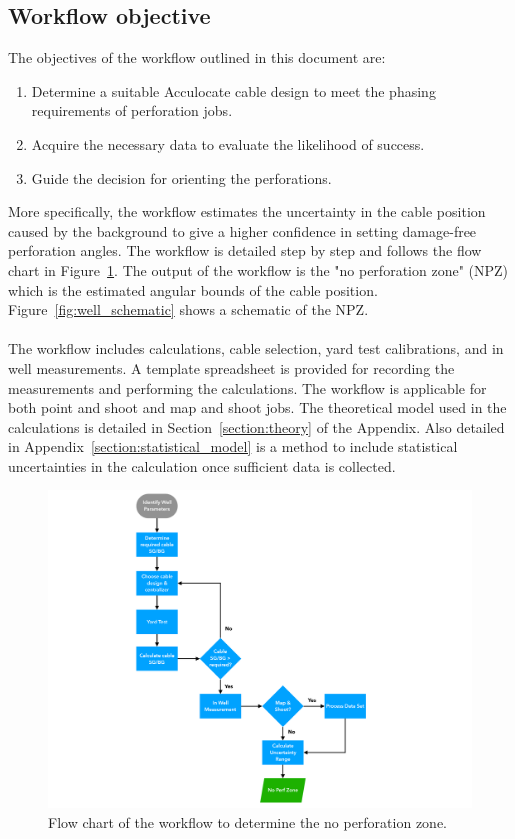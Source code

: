 \documentclass[paper=a4, fontsize=11pt]{scrartcl}
\numberwithin{equation}{section}		%
\numberwithin{figure}{section}			%
\numberwithin{table}{section}				%
\begin{document}
\subsection{Workflow objective}
The objectives of the workflow outlined in this document are:
\begin{enumerate}
    \item Determine a suitable Acculocate cable design to meet the phasing requirements of perforation jobs.
    \item Acquire the necessary data to evaluate the likelihood of success.
    \item Guide the decision for orienting the perforations.
\end{enumerate}
More specifically, the workflow estimates the uncertainty in the cable position caused by the background to give a higher confidence in setting damage-free perforation angles.  The workflow is detailed step by step and follows the flow chart in Figure~\ref{fig:flowchart}.  The output of the workflow is the "no perforation zone" (NPZ) which is the estimated angular bounds of the cable position.  Figure~\ref{fig:well_schematic} shows a schematic of the NPZ.

\paragraph{}
The workflow includes calculations, cable selection, yard test calibrations, and in well measurements.  A template spreadsheet is provided for recording the measurements and performing the calculations.  The workflow is applicable for both point and shoot and map and shoot jobs. The theoretical model used in the calculations is detailed in Section~\ref{section:theory} of the Appendix.  Also detailed in Appendix~\ref{section:statistical_model} is a method to include statistical uncertainties in the calculation once sufficient data is collected.  

\begin{figure}[h!]
    \caption{Flow chart of the workflow to determine the no perforation zone.}
    \label{fig:flowchart}
    \centering
    \includegraphics[width=1.0\textwidth]{figures/flow_chart.pdf}
\end{figure}
\end{document}
